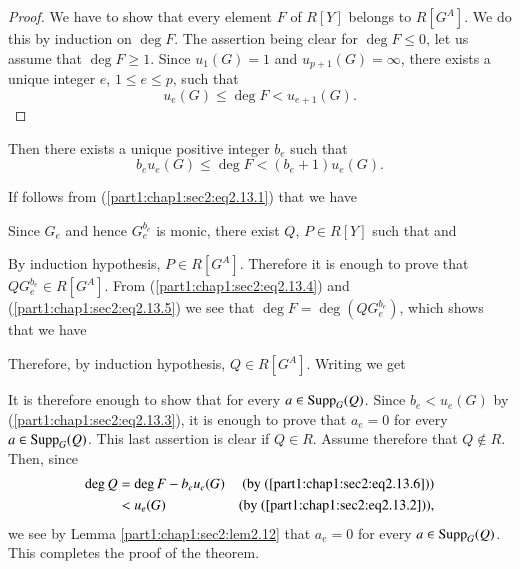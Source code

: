 \begin{proof}
  We have to show that every element $F$ of $R[Y]$ belongs to $R[G^A]$. We do this by induction on $\deg F$. The assertion being clear for $\deg F \leq 0$, let us assume that $\deg F \geq 1$. Since $u_1 (G)=1$ and $u_{p+1}(G)= \infty$, there exists a unique integer $e$, $1 \leq e\leq p$, such that
\begin{equation*}
u_e (G) \leq \deg F < u_{e+1} (G).\label{part1:chap1:sec2:eq2.13.1}
\end{equation*}
\end{proof}

Then there exists a unique positive integer $b_e$ such that 
\begin{equation*}
  b_e u_e (G) \leq \deg F < (b_e +1) u_e (G).\tag{2.13.2} \label{part1:chap1:sec2:eq2.13.2}
\end{equation*}

If follows from (\ref{part1:chap1:sec2:eq2.13.1}) that we have

Since $G_e$ and hence $G_{e}^{b_e}$ is monic, there exist $Q$, $P \in R [Y]$ such that 
and\pageoriginale
{}

By induction hypothesis, $P \in R [G^A]$. Therefore it is enough to prove that $Q G^{b_e}_e \in R [G^A]$. From (\ref{part1:chap1:sec2:eq2.13.4}) and (\ref{part1:chap1:sec2:eq2.13.5}) we see that $\deg F = \deg (Q G_e^{b_e})$, which shows that we have

Therefore, by induction hypothesis, $Q \in R [G^A]$. Writing
we get 

It is therefore enough to show that
for every $a \in \operatorname{Supp}_G (Q)$. Since $b_e < u_e (G)$ by (\ref{part1:chap1:sec2:eq2.13.3}), it is enough to prove that $a_e=0$ for every $a \in \operatorname{Supp}_G (Q)$. This last assertion is clear if $Q \in R$. Assume therefore that $Q \notin R$. Then, since
\begin{align*}
  \deg Q & = \deg F - b_e u_e (G)  & (\text{by (\ref{part1:chap1:sec2:eq2.13.6})})\\
  &< u_e (G)  & (\text{by (\ref{part1:chap1:sec2:eq2.13.2})}),
\end{align*}
we see by Lemma \ref{part1:chap1:sec2:lem2.12} that $a_e =0$ for every $a \in \operatorname{Supp}_G (Q)$. This completes the proof of the theorem.

